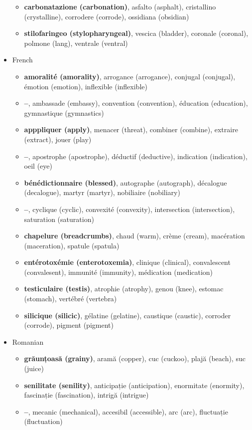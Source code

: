 \documentclass[output=paper]{langsci/langscibook}
\begin{document}
\begin{itemize}[leftmargin=*]
\begin{itemize}
		\item \textbf{carbonatazione (carbonation)}, asfalto (asphalt), cristallino (crystalline), corrodere (corrode), ossidiana (obsidian)
		\item \textbf{stilofaringeo (stylopharyngeal)}, vescica (bladder), coronale (coronal), polmone (lang), ventrale (ventral)
	\end{itemize}
	\item French
	\begin{itemize}
		\item \textbf{amoralité (amorality)}, arrogance (arrogance), conjugal (conjugal), émotion (emotion), inflexible (inflexible)
		\item \textbf{--}, ambassade (embassy), convention (convention), éducation (education), gymnastique (gymnastics)
		\item \textbf{apppliquer (apply)}, menacer (threat), combiner (combine), extraire (extract), jouer (play)
		\item \textbf{--}, apostrophe (apostrophe), déductif (deductive), indication (indication), oeil (eye)
		\item \textbf{bénédictionnaire (blessed)}, autographe (autograph), décalogue (decalogue), martyr (martyr), nobiliaire (nobiliary)
		\item \textbf{--}, cyclique (cyclic), convexité (convexity), intersection (intersection), saturation (saturation)
		\item \textbf{chapelure (breadcrumbs)}, chaud (warm), crème (cream), macération (maceration), spatule (spatula)
		\item \textbf{entérotoxémie (enterotoxemia)}, clinique (clinical), convalescent (convalesent), immunité (immunity), médication (medication)
		\item \textbf{testiculaire (testis)}, atrophie (atrophy), genou (knee), estomac (stomach), vertébré (vertebra)
		\item \textbf{silicique (silicic)}, gélatine (gelatine), caustique (caustic), corroder (corrode), pigment (pigment)
	\end{itemize}
	\item Romanian
	\begin{itemize}
		\item \textbf{grăunțoasă (grainy)}, aramă (copper), cuc (cuckoo), plajă (beach), suc (juice)
		\item \textbf{senilitate (senility)}, anticipație (anticipation), enormitate (enormity), fascinație (fascination), intrigă (intrigue)
		\item \textbf{--}, mecanic (mechanical), accesibil (accessible), arc (arc), fluctuație (fluctuation)

\end{itemize}
\end{itemize}
\end{document}
